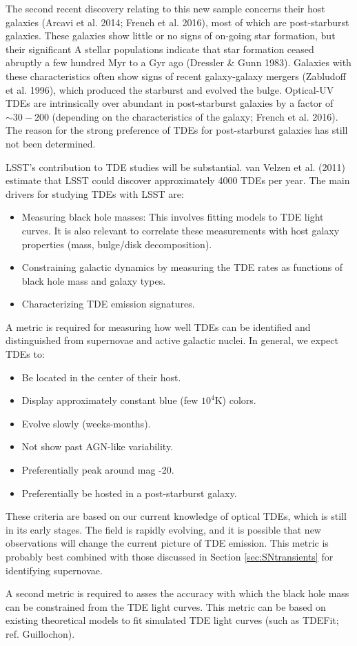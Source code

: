 The second recent discovery relating to this new sample concerns their
host galaxies (Arcavi et al. 2014; French et al. 2016), most of which are
post-starburst galaxies. These galaxies show little or no signs of on-going star formation, but their significant A stellar populations indicate that star formation ceased abruptly a few hundred Myr to a Gyr ago (Dressler \& Gunn 1983). Galaxies with these characteristics often show signs of recent galaxy-galaxy mergers (Zabludoff et al. 1996), which produced the starburst and evolved the bulge. Optical-UV TDEs are intrinsically over abundant in post-starburst galaxies by a factor of $\sim30-200$ (depending on the characteristics of the galaxy; French et al. 2016). The reason for the strong preference of TDEs for post-starburst galaxies has still not been determined.

LSST's contribution to TDE studies will be substantial. van Velzen et al. (2011) estimate that LSST could discover approximately 4000 TDEs per year. The main drivers for studying TDEs with LSST are:
\begin{itemize}
\item Measuring black hole masses: This involves fitting models to TDE light curves. It is also relevant to correlate these measurements with host galaxy properties (mass, bulge/disk decomposition). 
\item Constraining galactic dynamics by measuring the TDE rates as functions of black hole mass and galaxy types. 
\item Characterizing TDE emission signatures. 
\end{itemize}

A metric is required for measuring how well TDEs can be identified and distinguished from supernovae and active galactic nuclei. In general, we expect TDEs to:
\begin{itemize}
\item Be located in the center of their host.
\item Display approximately constant blue (few $10^4$K) colors.
\item Evolve slowly (weeks-months).
\item Not show past AGN-like variability.
\item Preferentially peak around mag -20.
\item Preferentially be hosted in a post-starburst galaxy.
\end{itemize}
These criteria are based on our current knowledge of optical TDEs, which is still in its early stages. The field is rapidly evolving, and it is possible that new observations will change the current picture of TDE emission. 
This metric is probably best combined with those discussed in Section \ref{sec:SNtransients} for identifying supernovae.

A second metric is required to asses the accuracy with which the black hole mass can be constrained from the TDE light curves. This metric can be based on existing theoretical models to fit simulated TDE light curves (such as TDEFit; ref. Guillochon). 


